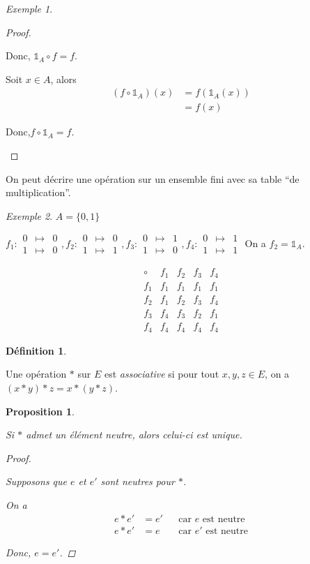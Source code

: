 \documentclass{report}
\newtheorem*{prop}{Proposition}
\theoremstyle{definition}
\newtheorem*{defin}{D\'efinition}
\theoremstyle{remark}
\newtheorem*{exem}{Exemple}
\begin{document}
\begin{exem}
\begin{ulist}
\begin{proof}
\begin{nlist}
					Donc, $\mathds{1}_A \circ f=f$.
					\item Soit $x \in A$, alors
					\begin{align*}
						(f \circ \mathds{1}_A)(x)&= f(\mathds{1}_A(x))\\
						&=f(x)
					\end{align*}

					Donc,$f \circ \mathds{1}_A=f$.
				\end{nlist}
			\end{proof}
		\end{ulist}
	\end{exem}

	On peut d\'ecrire une op\'eration sur un ensemble fini avec sa table ``de multiplication''.
	\begin{exem}
		$A=\{0,1\}$

		$f_1:\begin{array}{rcl}
			0&\mapsto&0\\
			1&\mapsto&0
		\end{array},f_2:\begin{array}{rcl}
			0&\mapsto&0\\
			1&\mapsto&1
		\end{array},f_3:\begin{array}{rcl}
			0&\mapsto&1\\
			1&\mapsto&0
		\end{array},f_4:\begin{array}{rcl}
			0&\mapsto&1\\
			1&\mapsto&1
		\end{array}$
		On a $f_2=\mathds{1}_A$.

		\[
		\begin{array}{c||c|c|c|c}
			\circ&f_1&f_2&f_3&f_4\\
			\hline\hline
			f_1&f_1&f_1&f_1&f_1\\
			\hline
			f_2&f_1&f_2&f_3&f_4\\
			\hline
			f_3&f_4&f_3&f_2&f_1\\
			\hline
			f_4&f_4&f_4&f_4&f_4
		\end{array}
		\]
	\end{exem}
	\begin{defin}
		~

		Une op\'eration $*$ sur $E$ est \emph{associative} si pour tout $x,y,z \in E$, on a $(x*y)*z=x*(y*z)$.
	\end{defin}
	\begin{prop}
		~

		Si $*$ admet un \'el\'ement neutre, alors celui-ci est \emph{unique}.
		\begin{proof}~

			Supposons que $e$ et $e'$ sont neutres pour $*$.

			On a
			\begin{align*}
				e*e'&=e'&&\text{car $e$ est neutre}\\
				e*e'&=e&&\text{car $e'$ est neutre}
			\end{align*}

			Donc, $e=e'$.
		\end{proof}
	\end{prop}
\end{document}
